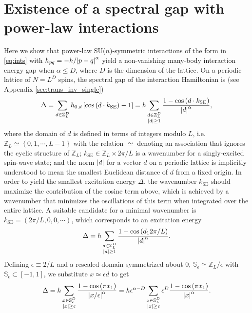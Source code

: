 \documentclass[nofootinbib,notitlepage,11pt]{revtex4-2}
\renewcommand{\t}{\text} %
\newcommand{\f}[2]{\dfrac{#1}{#2}} %
\newcommand{\p}[1]{\left(#1\right)} %
\renewcommand{\sp}[1]{\left[#1\right]} %
\renewcommand{\set}[1]{\left\{#1\right\}} %
\renewcommand{\c}{\cdot} %
\newcommand{\1}{\mathds{1}}
\renewcommand{\SS}{\mathbb{S}}
\newcommand{\ZZ}{\mathbb{Z}}
\begin{document}
\newpage
\appendix

\section{Existence of a spectral gap with power-law interactions}
\label{sec:gap}

Here we show that power-law SU($n$)-symmetric interactions of the form
in \eqref{eq:ints} with $h_{pq}=-h/\abs{p-q}^\alpha$ yield a
non-vanishing many-body interaction energy gap when $\alpha\le D$,
where $D$ is the dimension of the lattice.  On a periodic lattice of
$N=L^D$ spins, the spectral gap of the interaction Hamiltonian is (see
Appendix \ref{sec:trans_inv_single})
\begin{align}
  \Delta
  = \sum_{d\in\ZZ_L^D} h_{0,d} \sp{\cos\p{d \c k_{\t{SE}}}-1}
  = h \sum_{\substack{d\in\ZZ_L^D\\\abs{d}\ge1}}
  \f{1-\cos\p{d \c k_{\t{SE}}}}{\abs{d}^\alpha},
\end{align}
where the domain of $d$ is defined in terms of integers modulo $L$,
i.e.~$\ZZ_L\simeq\set{0,1,\cdots,L-1}$ with the relation $\simeq$
denoting an association that ignores the cyclic structure of $\ZZ_L$;
$k_{\t{SE}}\in\ZZ_L\times2\pi/L$ is a wavenumber for a singly-excited
spin-wave state; and the norm $\abs{d}$ for a vector $d$ on a periodic
lattice is implicitly understood to mean the smallest Euclidean
distance of $d$ from a fixed origin.  In order to yield the smallest
excitation energy $\Delta$, the wavenumber $k_{\t{SE}}$ should
maximize the contribution of the cosine term above, which is achieved
by a wavenumber that minimizes the oscillations of this term when
integrated over the entire lattice.  A suitable candidate for a
minimal wavenumber is $k_{\t{SE}}=\p{2\pi/L,0,0,\cdots}$, which
corresponds to an excitation energy
\begin{align}
  \Delta = h \sum_{\substack{d\in\ZZ_L^D\\\abs{d}\ge1}}
  \f{1-\cos\p{d_12\pi/L}}{\abs{d}^\alpha}.
\end{align}
Defining $\epsilon\equiv2/L$ and a rescaled domain symmetrized about
$0$, $\SS_\epsilon\simeq\ZZ_L/\epsilon$ with
$\SS_\epsilon\subset\sp{-1,1}$, we substitute $x\simeq\epsilon d$ to
get
\begin{align}
  \Delta
  = h \sum_{\substack{x\in\SS_\epsilon^D\\\abs{x}\ge\epsilon}}
  \f{1-\cos\p{\pi x_1}}{\abs{x/\epsilon}^\alpha}
  = h \epsilon^{\alpha-D} \sum_{\substack{x\in\SS_L^D\\\abs{x}\ge\epsilon}}
  \epsilon^D \f{1-\cos\p{\pi x_1}}{\abs{x}^\alpha}.
\end{align}
\end{document}
